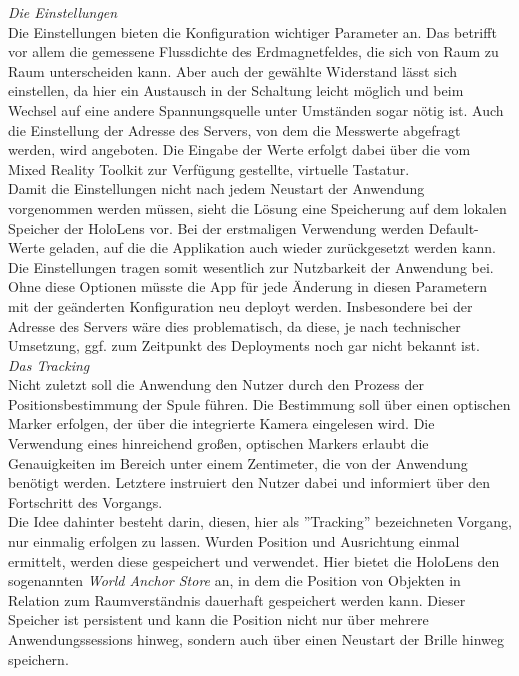 \textit{Die Einstellungen}\\
Die Einstellungen bieten die Konfiguration wichtiger Parameter an. Das betrifft vor allem die gemessene Flussdichte des Erdmagnetfeldes, die sich von Raum zu Raum unterscheiden kann. Aber auch der gewählte Widerstand lässt sich einstellen, da hier ein Austausch in der Schaltung leicht möglich und beim Wechsel auf eine andere Spannungsquelle unter Umständen sogar nötig ist. Auch die Einstellung der Adresse des Servers, von dem die Messwerte abgefragt werden, wird angeboten. Die Eingabe der Werte erfolgt dabei über die vom Mixed Reality Toolkit zur Verfügung gestellte, virtuelle Tastatur.\\

Damit die Einstellungen nicht nach jedem Neustart der Anwendung vorgenommen werden müssen, sieht die Lösung eine Speicherung auf dem lokalen Speicher der HoloLens vor. Bei der erstmaligen Verwendung werden Default-Werte geladen, auf die die Applikation auch wieder zurückgesetzt werden kann. Die Einstellungen tragen somit wesentlich zur Nutzbarkeit der Anwendung bei. Ohne diese Optionen müsste die App für jede Änderung in diesen Parametern mit der geänderten Konfiguration neu deployt werden. Insbesondere bei der Adresse des Servers wäre dies problematisch, da diese, je nach technischer Umsetzung, ggf. zum Zeitpunkt des Deployments noch gar nicht bekannt ist.\\

\textit{Das Tracking}\\
Nicht zuletzt soll die Anwendung den Nutzer durch den Prozess der Positionsbestimmung der Spule führen. Die Bestimmung soll über einen optischen Marker erfolgen, der über die integrierte Kamera eingelesen wird. Die Verwendung eines hinreichend großen, optischen Markers erlaubt die Genauigkeiten im Bereich unter einem Zentimeter, die von der Anwendung benötigt werden. Letztere instruiert den Nutzer dabei und informiert über den Fortschritt des Vorgangs.\\

Die Idee dahinter besteht darin, diesen, hier als ''Tracking'' bezeichneten Vorgang, nur einmalig erfolgen zu lassen. Wurden Position und Ausrichtung einmal ermittelt, werden diese gespeichert und verwendet. Hier bietet die HoloLens den sogenannten \textit{World Anchor Store} an, in dem die Position von Objekten in Relation zum Raumverständnis dauerhaft gespeichert werden kann. Dieser Speicher ist persistent und kann die Position nicht nur über mehrere Anwendungssessions hinweg, sondern auch über einen Neustart der Brille hinweg speichern.\\ 

